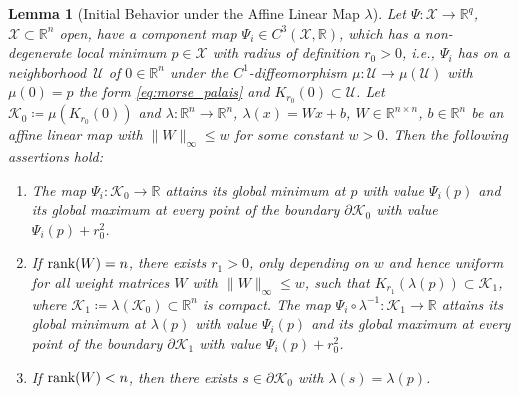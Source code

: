 \documentclass[10pt]{article}
\numberwithin{equation}{section}
\newtheorem{lemma}[theorem]{Lemma}
\newcommand\normm[1]{\big\lVert#1\big\lVert}
\begin{document}
	\begin{lemma}[Initial Behavior under the Affine Linear Map $\lambda$] \label{lem:initial_behavior}
		Let $\Psi:\mathcal{X}\rightarrow \mathbb{R}^q$,  $\mathcal{X}\subset \mathbb{R}^n$ open, have a component map $\Psi_i\in C^3(\mathcal{X}, \mathbb{R})$, which has a non-degenerate local minimum $p \in \mathcal{X}$ with radius of definition $r_0>0$, i.e., $\Psi_i$ has on a neighborhood~$\mathcal{U}$ of $0\in \mathbb{R}^n$ under the $C^1$-diffeomorphism $\mu:\mathcal{U}\rightarrow \mu(\mathcal{U})$  with $\mu(0) = p$ the form \eqref{eq:morse_palais} and $K_{r_0}(0)\subset \mathcal{U}$. Let $\mathcal{K}_0 \coloneqq \mu(K_{r_0}(0))$ and $\lambda: \mathbb{R}^n \rightarrow \mathbb{R}^n$, $\lambda(x) = Wx+b$, $W\in \mathbb{R}^{n\times n}$, $b\in \mathbb{R}^n$ be an affine linear map with $\normm{W}_\infty\leq w$ for some constant $w>0$. Then the following assertions hold:
		\begin{enumerate}[label=(\alph*), font=\normalfont]
			\item The map $ \Psi_i: \mathcal{K}_0 \rightarrow \mathbb{R}$ attains its global minimum at $p$ with value $\Psi_i(p)$ and its global maximum at every point of the boundary $\partial \mathcal{K}_0$ with value $\Psi_i(p)+r_0^2$.
			\item If $\textup{rank}(W) = n$, there exists $r_1 > 0$, only depending on $w$ and hence uniform for all weight matrices $W$ with  $\normm{W}_\infty\leq w$, such that $K_{r_1}(\lambda(p)) \subset \mathcal{K}_1$, where $\mathcal{K}_1\coloneqq \lambda(\mathcal{K}_0)\subset \mathbb{R}^n$ is compact. The map $ \Psi_i \circ \lambda^{-1}: \mathcal{K}_1 \rightarrow \mathbb{R}$ attains its global minimum at $\lambda(p)$ with value $\Psi_i(p)$ and its global maximum at every point of the boundary $\partial \mathcal{K}_1$ with value $\Psi_i(p)+r_0^2$. 
			\item If $\textup{rank}(W)< n$, then there exists $s \in \partial \mathcal{K}_0$ with $\lambda(s)= \lambda(p)$.
		\end{enumerate}
	\end{lemma}
	
\end{document}

